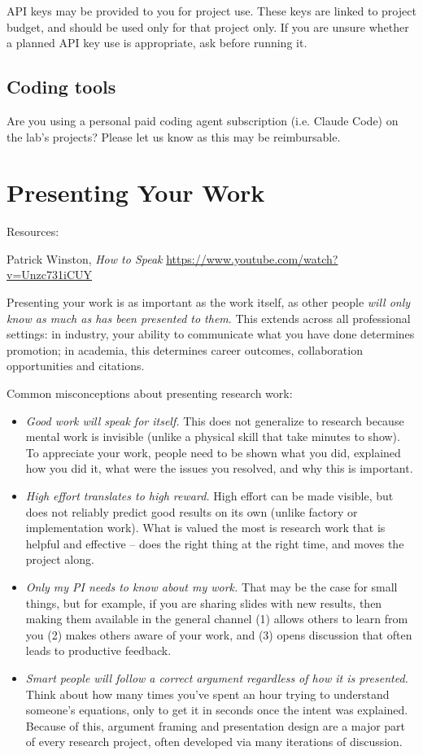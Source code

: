 \documentclass[11pt, letterpaper]{article}
\begin{document}
API keys may be provided to you for project use. These keys are linked to project budget, and should be used only for that project only. If you are unsure whether a planned API key use is appropriate, ask before running it.

\subsection*{Coding tools}
Are you using a personal paid coding agent subscription (i.e. Claude Code) on the lab's projects? Please let us know as this may be reimbursable.



\section{Presenting Your Work}

Resources:

Patrick Winston, \textit{How to Speak} \url{https://www.youtube.com/watch?v=Unzc731iCUY}

Presenting your work is as important as the work itself, as other people \textit{will only know as much as has been presented to them}. This extends across all professional settings: in industry, your ability to communicate what you have done determines promotion; in academia, this determines career outcomes, collaboration opportunities and citations.

Common misconceptions about presenting research work:

\begin{itemize}
    \item \textit{Good work will speak for itself.} This does not generalize to research because mental work is invisible (unlike a physical skill that take minutes to show). To appreciate your work, people need to be shown what you did, explained how you did it, what were the issues you resolved, and why this is important.
    \item \textit{High effort translates to high reward.} High effort can be made visible, but does not reliably predict good results on its own (unlike factory or implementation work). What is valued the most is research work that is helpful and effective -- does the right thing at the right time, and moves the project along.
    \item \textit{Only my PI needs to know about my work.} That may be the case for small things, but for example, if you are sharing slides with new results, then making them available in the general channel (1) allows others to learn from you (2) makes others aware of your work, and (3) opens discussion that often leads to productive feedback.
    \item \textit{Smart people will follow a correct argument regardless of how it is presented.} Think about how many times you've spent an hour trying to understand someone's equations, only to get it in seconds once the intent was explained. Because of this, argument framing and presentation design are a major part of every research project, often developed via many iterations of discussion.
\end{itemize}    
\end{document}
